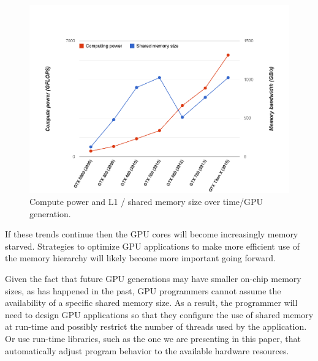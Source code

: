 \begin{figure}
\center
\includegraphics[scale=0.26]{computevsshared.png}
\caption{\footnotesize\textnormal{Compute power and  L1 / shared memory size over time/GPU generation.}}
\label{fig:memsize}
\end{figure}

If these trends continue then the GPU cores will become increasingly memory starved.
Strategies to optimize GPU applications to make more efficient use of the memory hierarchy will likely become more important going forward.

Given the fact that future GPU generations may have smaller on-chip memory sizes, as has happened in
the past, GPU programmers cannot assume the availability of a specific shared memory size.
As a result, the programmer will need to design GPU applications so that they configure the use of
shared memory at run-time and possibly restrict the number of threads used by the application.
Or use run-time libraries, such as the one we are presenting in this paper, that automatically
adjust program behavior to the available hardware resources.

